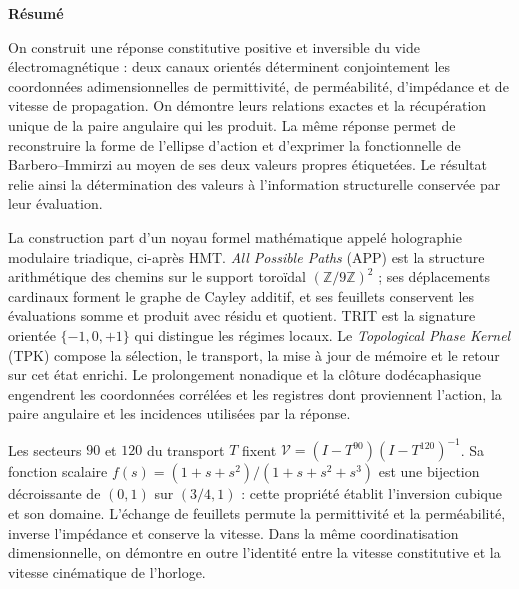 \begin{center}\bfseries Résumé\end{center}
{}
\begingroup
\fontsize{9.5}{10.7}\selectfont
\setlength{\parskip}{1.5pt plus .5pt minus .5pt}
\fontsize{10.2}{11.6}\selectfont
\setlength{\parskip}{1pt plus .5pt minus .5pt}
\enlargethispage{2\baselineskip}
\noindent
On construit une réponse constitutive positive et inversible du vide
électromagnétique : deux canaux orientés déterminent conjointement les
coordonnées adimensionnelles de permittivité, de perméabilité, d’impédance et de
vitesse de propagation. On démontre leurs relations exactes et la
récupération unique de la paire angulaire qui les produit. La même réponse
permet de reconstruire la forme de l’ellipse d’action et d’exprimer la
fonctionnelle de Barbero--Immirzi au moyen de ses deux valeurs propres étiquetées.
Le résultat relie ainsi la détermination des valeurs à
l’information structurelle conservée par leur évaluation.

La construction part d’un noyau formel mathématique appelé
holographie modulaire triadique, ci-après HMT. \emph{All Possible Paths}
(APP) est la structure arithmétique des chemins sur le support toroïdal
$(\mathbb Z/9\mathbb Z)^2$ ; ses déplacements cardinaux forment le
graphe de Cayley additif, et ses feuillets conservent les évaluations somme et
produit avec résidu et quotient. TRIT est la signature orientée
$\{-1,0,+1\}$ qui distingue les régimes locaux. Le
\emph{Topological Phase Kernel} (TPK) compose la sélection, le transport,
la mise à jour de mémoire et le retour sur cet état enrichi. Le
prolongement nonadique et la clôture dodécaphasique engendrent les coordonnées
corrélées et les registres dont proviennent l’action, la paire
angulaire et les incidences utilisées par la réponse.

Les secteurs $90$ et $120$ du transport $T$ fixent
$\mathcal V=(I-T^{90})(I-T^{120})^{-1}$. Sa fonction scalaire
$f(s)=(1+s+s^2)/(1+s+s^2+s^3)$ est une bijection décroissante de $(0,1)$
sur $(3/4,1)$ : cette propriété établit l’inversion cubique et son
domaine. L’échange de feuillets permute la permittivité et la perméabilité,
inverse l’impédance et conserve la vitesse. Dans la même coordinatisation dimensionnelle,
on démontre en outre l’identité entre la vitesse constitutive et la
vitesse cinématique de l’horloge.

